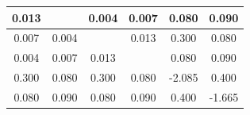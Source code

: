 \documentclass[conference]{IEEEtran}
\begin{document}
\begin{table}[!h]
{\begin{tabular}{ |c|c|c|c|c|c| }
	\hline 0.013 &  & 0.004 & 0.007 & 0.080 & 0.090 \\
	\hline 0.007 & 0.004 &  & 0.013 & 0.300 & 0.080 \\
	\hline 0.004 & 0.007 & 0.013 &  & 0.080 & 0.090 \\
	\hline 0.300 & 0.080 & 0.300 & 0.080 & -2.085 & 0.400 \\
	\hline 0.080 & 0.090 & 0.080 & 0.090 & 0.400 & -1.665 \\
	\hline
	\end{tabular}
}
\vspace{-0.2in}
\end{table}

\end{document}
